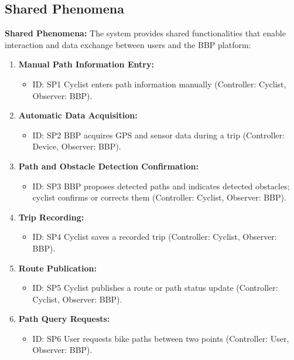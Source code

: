 \subsection{Shared Phenomena}
\label{subsec:shared_phenomena}%
\setcounter{sp}{1}
\newcommand{\csp}{\thesp\stepcounter{sp}}
\textbf{Shared Phenomena:}
The system provides shared functionalities that enable interaction and data exchange between users and the BBP platform:
\begin{enumerate}
    \item \textbf{Manual Path Information Entry:}
    \begin{itemize}
        \item ID: SP1 Cyclist enters path information manually (Controller: Cyclist, Observer: BBP).
    \end{itemize}

    \item \textbf{Automatic Data Acquisition:}
    \begin{itemize}
        \item ID: SP2 BBP acquires GPS and sensor data during a trip (Controller: Device, Observer: BBP).
    \end{itemize}

    \item \textbf{Path and Obstacle Detection Confirmation:}
    \begin{itemize}
        \item ID: SP3 BBP proposes detected paths and indicates detected obstacles; cyclist confirms or corrects them (Controller: Cyclist, Observer: BBP).
    \end{itemize}

    \item \textbf{Trip Recording:}
    \begin{itemize}
        \item ID: SP4 Cyclist saves a recorded trip (Controller: Cyclist, Observer: BBP).
    \end{itemize}

    \item \textbf{Route Publication:}
    \begin{itemize}
        \item ID: SP5 Cyclist publishes a route or path status update (Controller: Cyclist, Observer: BBP).
    \end{itemize}

    \item \textbf{Path Query Requests:}
    \begin{itemize}
        \item ID: SP6 User requests bike paths between two points (Controller: User, Observer: BBP).
    \end{itemize}


\end{enumerate}
